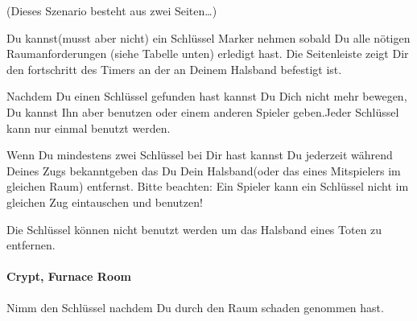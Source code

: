 

\vspace{2cm}
(Dieses Szenario besteht aus zwei Seiten…)
\newpage

  \begin{itemize}
        \bitem Du kannst(musst aber nicht) ein Schlüssel Marker nehmen sobald Du alle nötigen Raumanforderungen (siehe Tabelle unten) erledigt hast. Die Seitenleiste zeigt Dir den fortschritt des Timers an der an Deinem Halsband befestigt ist.

        \bitem Nachdem Du einen Schlüssel gefunden hast kannst Du Dich nicht mehr bewegen, Du kannst Ihn aber benutzen oder einem anderen Spieler geben.Jeder Schlüssel kann nur einmal benutzt werden.

        \bitem Wenn Du mindestens zwei Schlüssel bei Dir hast kannst Du jederzeit während Deines Zugs bekanntgeben das Du Dein Halsband(oder das eines Mitspielers im gleichen Raum) entfernst.
        Bitte beachten: Ein Spieler kann ein Schlüssel nicht im gleichen Zug eintauschen und benutzen!

        \bitem Die Schlüssel können nicht benutzt werden um das Halsband eines Toten zu entfernen.
    \end{itemize}

\paragraph{Crypt, Furnace Room} Nimm den Schlüssel nachdem Du durch den Raum schaden genommen hast.
